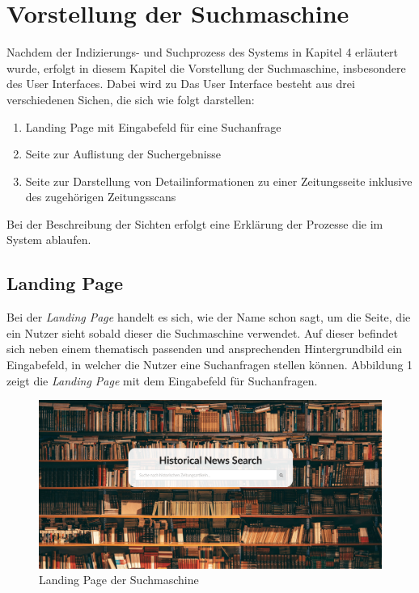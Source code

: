 \documentclass[11pt,a4paper, halfparskip]{scrartcl}
\begin{document}
\section{Vorstellung der Suchmaschine}

Nachdem der Indizierungs- und Suchprozess des Systems in Kapitel 4 erläutert wurde, erfolgt in diesem Kapitel die Vorstellung der Suchmaschine, insbesondere des User Interfaces.
Dabei wird zu 
Das User Interface besteht aus drei verschiedenen Sichen, die sich wie folgt darstellen:
	\begin{enumerate}
		\item Landing Page mit Eingabefeld für eine Suchanfrage
		\item Seite zur Auflistung der Suchergebnisse
		\item Seite zur Darstellung von Detailinformationen zu einer Zeitungsseite inklusive des zugehörigen Zeitungsscans  	
	\end{enumerate}
Bei der Beschreibung der Sichten erfolgt eine Erklärung der Prozesse die im System ablaufen.

\subsection{Landing Page}

Bei der \textit{Landing Page} handelt es sich, wie der Name schon sagt, um die Seite, die ein Nutzer sieht sobald dieser die Suchmaschine verwendet.
Auf dieser befindet sich neben einem thematisch passenden und ansprechenden Hintergrundbild ein Eingabefeld, in welcher die Nutzer eine Suchanfragen stellen können. 
Abbildung 1 zeigt die \textit{Landing Page} mit dem Eingabefeld für Suchanfragen.

\begin{figure}[h]
	\includegraphics[width=\linewidth]{images/landing_page.png}
	\caption{Landing Page der Suchmaschine}
\end{figure}
\end{document}
